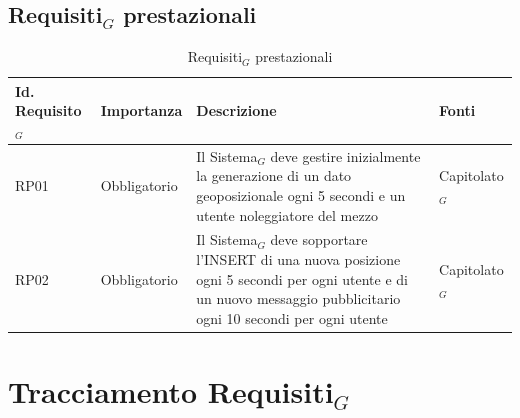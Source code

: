 \documentclass[10pt]{article}
\begin{document}
\begin{justify}
\subsection{Requisiti$_G$ prestazionali}

\begin{table}[H]
\centering
\renewcommand{\arraystretch}{1.5}
\begin{tabular}{|>{\centering\arraybackslash}m{2.7cm}|>{\centering\arraybackslash}m{2.7cm}|>{\centering\arraybackslash}m{6cm}|>{\centering\arraybackslash}m{2.1cm}|}
\hline
\textbf{Id. Requisito$_G$} & \textbf{Importanza} & \textbf{Descrizione} & \textbf{Fonti}\\
\hline
RP01 & Obbligatorio &  Il Sistema$_G$ deve gestire inizialmente la generazione di un dato geoposizionale ogni 5 secondi e un utente noleggiatore del mezzo & Capitolato$_G$\\
\hline
RP02 & Obbligatorio &  Il Sistema$_G$ deve sopportare l'INSERT di una nuova posizione ogni 5 secondi per ogni utente e di un nuovo messaggio pubblicitario ogni 10 secondi per ogni utente  & Capitolato$_G$\\
\hline
\end{tabular}
\caption{Requisiti$_G$ prestazionali}
\end{table}



\newpage
\section{Tracciamento Requisiti$_G$}


\end{justify}
\end{document}
